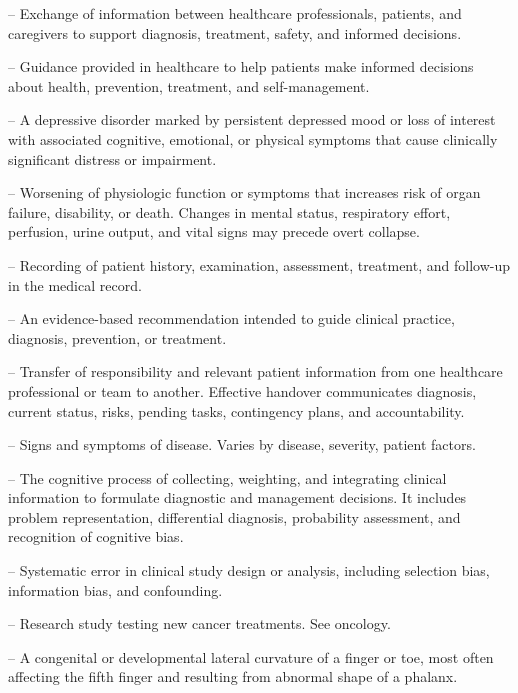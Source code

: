 -- Exchange of information between healthcare professionals, patients, and caregivers to support diagnosis, treatment, safety, and informed decisions.

-- Guidance provided in healthcare to help patients make informed decisions about health, prevention, treatment, and self-management.



-- A depressive disorder marked by persistent depressed mood or loss of interest with associated cognitive, emotional, or physical symptoms that cause clinically significant distress or impairment.

-- Worsening of physiologic function or symptoms that increases risk of organ failure, disability, or death. Changes in mental status, respiratory effort, perfusion, urine output, and vital signs may precede overt collapse.


-- Recording of patient history, examination, assessment, treatment, and follow-up in the medical record.

-- An evidence-based recommendation intended to guide clinical practice, diagnosis, prevention, or treatment.

-- Transfer of responsibility and relevant patient information from one healthcare professional or team to another. Effective handover communicates diagnosis, current status, risks, pending tasks, contingency plans, and accountability.


-- Signs and symptoms of disease. Varies by disease, severity, patient factors.

-- The cognitive process of collecting, weighting, and integrating clinical information to formulate diagnostic and management decisions. It includes problem representation, differential diagnosis, probability assessment, and recognition of cognitive bias.

-- Systematic error in clinical study design or analysis, including selection bias, information bias, and confounding.


-- Research study testing new cancer treatments. See oncology.

-- A congenital or developmental lateral curvature of a finger or toe, most often affecting the fifth finger and resulting from abnormal shape of a phalanx.



